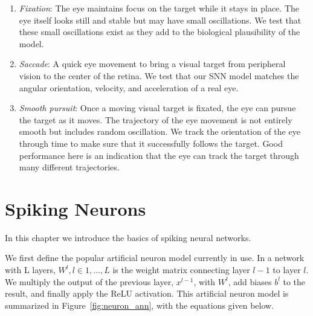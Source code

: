 \documentclass [MS] {UCLAthesis}
\begin{document}
\begin{enumerate}
    \item \textit{Fixation}: The eye maintains focus on the target while it stays in place. The eye itself looks still and stable but may have small oscillations. We test that these small oscillations exist as they add to the biological plausibility of the model. 
    \item \textit{Saccade}: A quick eye movement to bring a visual target from peripheral vision to the center of the retina. We test that our SNN model matches the angular orientation, velocity, and acceleration of a real eye.
    \item \textit{Smooth pursuit}: Once a moving visual target is fixated, the eye can pursue the target as it moves. The trajectory of the eye movement is not entirely smooth but includes random oscillation. We track the orientation of the eye through time to make sure that it successfully follows the target. Good performance here is an indication that the eye can track the target through many different trajectories.


\end{enumerate}


\chapter{Spiking Neurons}

In this chapter we introduce the basics of spiking neural networks.

We first define the popular artificial neuron model currently in use. In a network with L layers, $W^l, l \in {1, ..., L}$ is the weight matrix connecting layer $l-1$ to layer $l$. We multiply the output of the previous layer, $x^{l-1}$, with $W^l$, add biases $b^l$ to the result, and finally apply the ReLU activation. This artificial neuron model is summarized in Figure~\ref{fig:neuron_ann}, with the equations given below.

\end{document}
